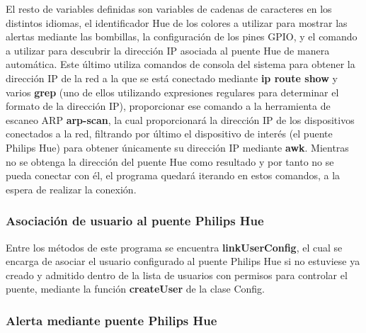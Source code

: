         El resto de variables definidas son variables de cadenas de caracteres en los distintos idiomas, el identificador Hue de los colores a utilizar para mostrar las alertas mediante las bombillas, la configuración de los pines GPIO, y el comando a utilizar para descubrir la dirección IP asociada al puente Hue de manera automática. Este último utiliza comandos de consola del sistema para obtener la dirección IP de la red a la que se está conectado mediante \textbf{ip route show} y varios \textbf{grep} (uno de ellos utilizando expresiones regulares para determinar el formato de la dirección IP), proporcionar ese comando a la herramienta de escaneo ARP \textbf{arp-scan}, la cual proporcionará la dirección IP de los dispositivos conectados a la red, filtrando por último el dispositivo de interés (el puente Philips Hue) para obtener únicamente su dirección IP mediante \textbf{awk}. Mientras no se obtenga la dirección del puente Hue como resultado y por tanto no se pueda conectar con él, el programa quedará iterando en estos comandos, a la espera de realizar la conexión.
        
        \subsubsection{Asociación de usuario al puente Philips Hue}

        \vspace{0.3cm}

        Entre los métodos de este programa se encuentra \textbf{linkUserConfig}, el cual se encarga de asociar el usuario configurado al puente Philips Hue si no estuviese ya creado y admitido dentro de la lista de usuarios con permisos para controlar el puente, mediante la función \textbf{createUser} de la clase Config.
        
        \subsubsection{Alerta mediante puente Philips Hue}

        \vspace{0.3cm}

